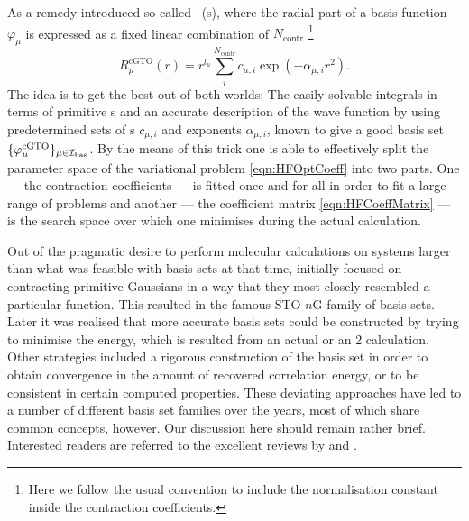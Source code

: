 As a remedy \citet{Hehre1969} introduced so-called
~({\cGTO}s),
where the radial part of a basis function $\varphi_\mu$
is expressed as a fixed linear combination of $N_\text{contr}$
%
\footnote{Here we follow the usual convention to include the normalisation constant
	inside the contraction coefficients.}
\[ R^\text{cGTO}_\mu(r) = r^{l_\mu} \sum_i^{N_\text{contr}} c_{\mu,i} \exp(-\alpha_{\mu,i} r^2). \]
The idea is to get the best out of both worlds:
The easily solvable integrals in terms of primitive {\GTO}s
and an accurate description of the wave function by using
predetermined sets of s
$c_{\mu,i}$ and exponents $\alpha_{\mu,i}$,
known to give a good basis set $\{\varphi^{\text{cGTO}}_\mu\}_{\mu\in\mathcal{I}_\text{bas}}$.
By the means of this trick
one is able to effectively split the parameter space of the variational problem
\eqref{eqn:HFOptCoeff} into two parts.
One --- the contraction coefficients ---
is fitted once and for all in order to fit a large range of problems
and another --- the coefficient matrix \eqref{eqn:HFCoeffMatrix} ---
is the search space over which one minimises during the actual calculation.

Out of the pragmatic desire to perform molecular calculations
on systems larger than what was feasible with \STO basis sets at that time,
\citet{Hehre1969} initially focused on contracting primitive Gaussians
in a way that they most closely resembled a particular \STO function.
This resulted in the famous STO-$n$G family of basis sets.
Later it was realised that more accurate basis sets could be constructed
by trying to minimise the energy,
which is resulted from an actual \HF or an {\MP}2 calculation.
Other strategies included a rigorous construction of the basis set
in order to obtain convergence in the amount of recovered correlation energy,
or to be consistent in certain computed properties.
These deviating approaches have led to a number of
different basis set families over the years,
most of which share common concepts, however.
Our discussion here should remain rather brief.
Interested readers are referred to the excellent reviews by \citet{Hill2013}
and \citet{Jensen2013}.

